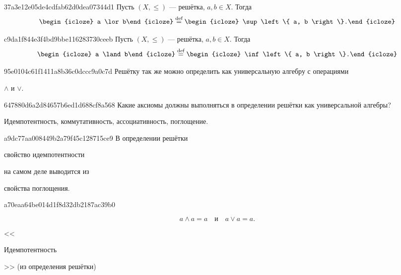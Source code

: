 \begin{note}{37a3e12e05de4cdfab62d0dea07344d1}
    Пусть \({ (X, \leqslant) }\) --- решётка, \({ a, b \in X }\).
    Тогда
    \[
        \begin{icloze}{2}a \lor b\end{icloze} \overset{\text{def}}= \begin{icloze}{1}\sup \left\{ a, b \right\}.\end{icloze}
    \]
\end{note}

\begin{note}{c9da1f844e3f4bd9bbe116283730ceeb}
    Пусть \({ (X, \leqslant) }\) --- решётка, \({ a, b \in X }\).
    Тогда
    \[
        \begin{icloze}{2}a \land b\end{icloze} \overset{\text{def}}= \begin{icloze}{1}\inf \left\{ a, b \right\}.\end{icloze}
    \]
\end{note}

\begin{note}{95e0104c61f1411a8b36c0dccc9a0c7d}
    Решётку так же можно определить как универсальную алгебру с операциями \begin{icloze}{1}\({ \land }\) и \({ \lor }\).\end{icloze}
\end{note}

\begin{note}{647880d6a2d84657b6ed1d688cf8a568}
    Какие аксиомы должны выполняться в определении решётки как универсальной алгебры?

    \begin{cloze}{1}
        Идемпотентность, коммутативность, ассоциативность, поглощение.
    \end{cloze}
\end{note}

\begin{note}{a9dc77aa008449b2a79f45c128715ce9}
    В определении решётки \begin{icloze}{1}свойство идемпотентности\end{icloze} на самом деле выводится из \begin{icloze}{2}свойства поглощения.\end{icloze}
\end{note}

\begin{note}{a70eaa64be014d1f8d32db2187ac39b0}
    \begin{icloze}{1}
        \[
            a \land a = a \quad \text{и} \quad a \lor a = a.
        \]
    \end{icloze}

    \begin{center}
        \tiny
        <<\begin{icloze}{2}Идемпотентность\end{icloze}>> (из определения решётки)
    \end{center}
\end{note}

